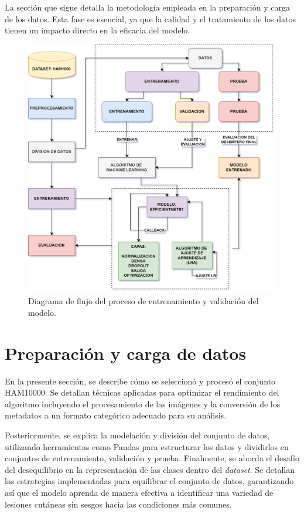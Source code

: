 La sección que sigue detalla la metodología empleada en la preparación y carga de los datos. Esta fase es esencial, ya que la calidad y el tratamiento de los datos tienen un impacto directo en la eficacia del modelo.

\begin{figure}[H]
   \begin{center}
   \includegraphics[width=1\textwidth]{./Graphics/model.png}
   \caption{Diagrama de flujo del proceso de entrenamiento  y validación del modelo.}
   \label{fig:model_structure}
   \end{center}
   \end{figure}

\section{Preparación y carga de datos}

En la presente sección, se describe cómo se seleccionó y procesó el conjunto HAM10000. Se detallan técnicas aplicadas para optimizar el rendimiento del algoritmo incluyendo el procesamiento de las imágenes y la conversión de los metadatos a un formato categórico adecuado para su análisis.

Posteriormente, se explica la modelación y división del conjunto de datos, utilizando herramientas como Pandas para estructurar los datos y dividirlos en conjuntos de entrenamiento, validación y prueba. Finalmente, se aborda el desafío del desequilibrio en la representación de las clases dentro del \textit{dataset}. Se detallan las estrategias implementadas para equilibrar el conjunto de datos, garantizando así que el modelo aprenda de manera efectiva a identificar una variedad de lesiones cutáneas sin sesgos hacia las condiciones más comunes.

